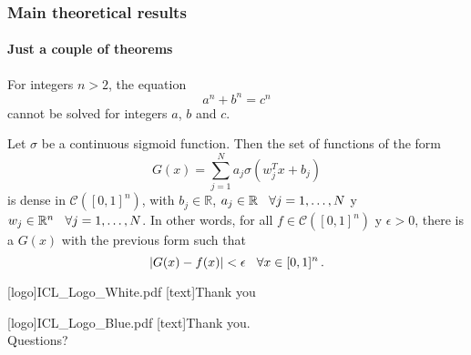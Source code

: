\documentclass[
	aspectratio=169, %
	t, %
	onlytextwidth, %
	10pt, %
]{beamer}
\begin{document}
\begin{frame}
	\frametitle{Main theoretical results}
	\framesubtitle{Just a couple of theorems}
	
	\begin{theorem}
		For integers $n>2$, the equation
		\[ a^n + b^n = c^n \]
		cannot be solved for integers $a$, $b$ and $c$.
	\end{theorem}

	\begin{theorem}
		\label{teo:AU}
		Let $\sigma$ be a continuous sigmoid function. Then the set of functions of the form
		$$ G(x) = \displaystyle \sum^N_{j=1}a_j\sigma(w^T_jx+b_j)$$
		is dense in $\mathcal{C}([0,1]^n)$, with $b_j \in \mathbb{R}$, $a_j\in \mathbb{R} \hspace{.25cm}\, \forall j=1,\dots,N$ y $w_j \in \mathbb{R}^n \hspace{.25cm}\, \forall j=1,\dots,N$.
		In other words, for all $f\in\mathcal{C}([0,1]^n)$ y $\epsilon>0$, there is a $G(x)$ with the previous form such that
		$$ |G(x)-f(x)|<\epsilon \hspace{.25cm}\, \forall x\in [0,1]^n\,.$$
	\end{theorem}

\end{frame}




\begingroup
	[logo]{ICL_Logo_White.pdf} %
	[text]{Thank you} %
	
\endgroup



\begingroup
	[logo]{ICL_Logo_Blue.pdf} %
	[text]{Thank you.\\ Questions?} %
	
\end{document}
